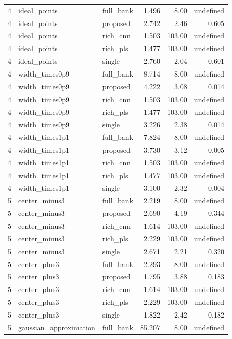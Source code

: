 \documentclass[10pt,a4paper]{article}
\begin{document}
\begin{landscape}
\begin{longtable}{lllrrr}
4 & ideal\_points & full\_bank & 1.496 & 8.00 & undefined \\
4 & ideal\_points & proposed & 2.742 & 2.46 & 0.605 \\
4 & ideal\_points & rich\_cnn & 1.503 & 103.00 & undefined \\
4 & ideal\_points & rich\_pls & 1.477 & 103.00 & undefined \\
4 & ideal\_points & single & 2.760 & 2.04 & 0.601 \\
4 & width\_times0p9 & full\_bank & 8.714 & 8.00 & undefined \\
4 & width\_times0p9 & proposed & 4.222 & 3.08 & 0.014 \\
4 & width\_times0p9 & rich\_cnn & 1.503 & 103.00 & undefined \\
4 & width\_times0p9 & rich\_pls & 1.477 & 103.00 & undefined \\
4 & width\_times0p9 & single & 3.226 & 2.38 & 0.014 \\
4 & width\_times1p1 & full\_bank & 7.824 & 8.00 & undefined \\
4 & width\_times1p1 & proposed & 3.730 & 3.12 & 0.005 \\
4 & width\_times1p1 & rich\_cnn & 1.503 & 103.00 & undefined \\
4 & width\_times1p1 & rich\_pls & 1.477 & 103.00 & undefined \\
4 & width\_times1p1 & single & 3.100 & 2.32 & 0.004 \\
5 & center\_minus3 & full\_bank & 2.219 & 8.00 & undefined \\
5 & center\_minus3 & proposed & 2.690 & 4.19 & 0.344 \\
5 & center\_minus3 & rich\_cnn & 1.614 & 103.00 & undefined \\
5 & center\_minus3 & rich\_pls & 2.229 & 103.00 & undefined \\
5 & center\_minus3 & single & 2.671 & 2.21 & 0.320 \\
5 & center\_plus3 & full\_bank & 2.293 & 8.00 & undefined \\
5 & center\_plus3 & proposed & 1.795 & 3.88 & 0.183 \\
5 & center\_plus3 & rich\_cnn & 1.614 & 103.00 & undefined \\
5 & center\_plus3 & rich\_pls & 2.229 & 103.00 & undefined \\
5 & center\_plus3 & single & 1.822 & 2.42 & 0.182 \\
5 & gaussian\_approximation & full\_bank & 85.207 & 8.00 & undefined \\

\end{longtable}
\end{landscape}
\end{document}
